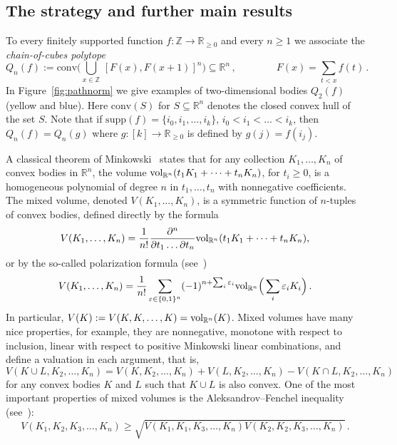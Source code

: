 \documentclass[a4paper,reqno,12pt]{amsart}
\newcommand{\z}{\mathbb{Z}}
\renewcommand{\r}{\mathbb{R}}
\newcommand{\ep}{\varepsilon}
\newcommand{\1}{\bo{1}}
\begin{document}
\subsection{The strategy and further main results}
To every finitely supported function $f:\z\to \r_{\ge0}$ and every $n\ge1$ we associate the \emph{chain-of-cubes polytope}
\begin{equation} \label{eq:qbodydefrecap}
	Q_n(f) := \mathrm{conv}\Big(\bigcup_{x \in \z}\,[F(x),F(x+1)]^n\Big)\subseteq \r^n\,,\qquad\qquad 
	F(x)=\sum_{t<x}f(t)\,.        
\end{equation}
 In Figure~\ref{fig:pathnorm} we give examples of two-dimensional bodies $Q_2(f)$ (yellow and blue). Here $\mathrm{conv}(S)$ for $S\subseteq\r^n$ denotes the closed convex hull of the set $S$. Note that if $\text{supp}(f)=\{i_0,i_1,\dots,i_k\}$, $i_0<i_1<\dots<i_k$, then $Q_n(f)=Q_n(g)$ where $g:[k]\to\r_{\geq 0}$ is defined by $g(j)=f(i_j)$.


A classical theorem of Minkowski~\cite{Mk} states that for any collection $K_1,\dots,K_n$ of convex bodies in $\r^n$, the volume ${\rm vol}_{\r^n}(t_1K_1+\dots+t_nK_n)$, for $t_i\ge0$, is a homogeneous polynomial of degree $n$ in $t_1,\dots,t_n$ with nonnegative coefficients. The mixed volume, denoted $V(K_1,\dots,K_n)$, is a symmetric function of $n$-tuples of convex bodies, defined directly by the formula
    \[V(K_1,\dots,K_n) = \frac{1}{n!}\frac{\partial^n}{\partial{t_1}\dots\partial{t_n}} {\rm vol}_{\r^n}(t_1K_1+\dots+t_nK_n),\]
or by the so-called polarization formula (see~\cite[\S19.1]{Bu-Za})
	\[V(K_1,\dots,K_n) = \frac{1}{n!}\sum_{\ep\in\{0,1\}^n}(-1)^{n+\sum_i\ep_i}{\rm vol}_{\r^n}\Big(\sum_{i}\ep_iK_i\Big)\,.\]
In particular, $V(K):=V(K,K,\dots,K)={\rm vol}_{\r^n}(K)$. Mixed volumes have many nice properties, for example, they are nonnegative, monotone with respect to inclusion, linear with respect to positive Minkowski linear combinations, and define a valuation in each argument, that is,
    \begin{equation} \label{eq:mixedvaluation}
    V(K\cup L,K_2,\dots,K_n)=V(K,K_2,\dots,K_n)+V(L,K_2,\dots,K_n)-V(K\cap L,K_2,\dots,K_n)
    \end{equation}
for any convex bodies $K$ and $L$ such that $K\cup L$ is also convex.
One of the most important properties of mixed volumes is the Aleksandrov--Fenchel inequality (see~\cite[\S20]{Bu-Za}):
    \begin{equation} \label{eq:alexandrov-fenchel}
    V(K_1,K_2,K_3,\dots,K_n) \ge \sqrt{V(K_1,K_1,K_3,\dots,K_n)V(K_2,K_2,K_3,\dots,K_n)}\,.
    \end{equation}
\end{document}

